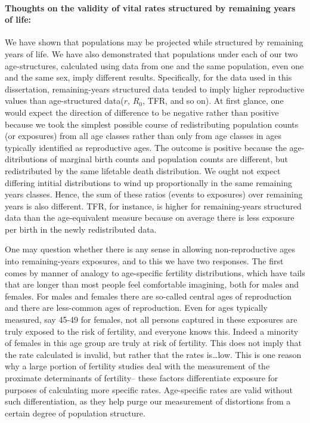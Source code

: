 \paragraph{Thoughts on the validity of vital rates structured by remaining
years of life: }
We have shown that populations may be projected while structured by
remaining years of life. We have also demonstrated that populations under each
of our two age-structures, calculated using data from one and the same
population, even one and the same sex, imply different results. Specifically, for the data used in this
dissertation, remaining-years structured data tended to imply higher
reproductive values than age-structured data($r$, $R_0$, TFR, and so
on). At first glance, one would expect the direction of difference to be
negative rather than positive because we took the simplest possible course of
redistributing population counts (or exposures) from all age classes rather than
only from age classes in ages typically identified as reproductive ages. The
outcome is positive because the age-ditributions of marginal birth counts and
population counts are different, but redistributed by the same lifetable death
distribution. We ought not expect differing intitial distributions to wind up
proportionally in the same remaining years classes. Hence, the sum of these
ratios (events to exposures) over remaining years is also different. TFR, for
instance, is higher for remaining-years structured data than the age-equivalent
measure because on average there is less exposure per birth in the newly
redistributed data.

One may question whether there is any sense in allowing non-reproductive ages
into remaining-years exposures, and to this we have two responses. The first
comes by manner of analogy to age-specific fertility distributions, which
have tails that are longer than most people feel comfortable imagining, 
both for males and females. For males and
females there are so-called central ages of reproduction and there are
less-common ages of reproduction. Even for ages typically measured, say
45-49 for females, not all persons captured in these exposures are truly
exposed to the risk of fertility, and everyone knows this. Indeed a minority
of females in this age group are truly at risk of fertility. This does not imply
that the rate calculated is invalid, but rather that the rates is\ldots low.
This is one reason why a large portion of fertility studies deal with the
measurement of the proximate determinants of fertility-- these
factors differentiate exposure for purposes of calculating more specific rates.
Age-specific rates are valid without such differentiation, as they help purge
our measurement of distortions from a certain degree of population structure. 

